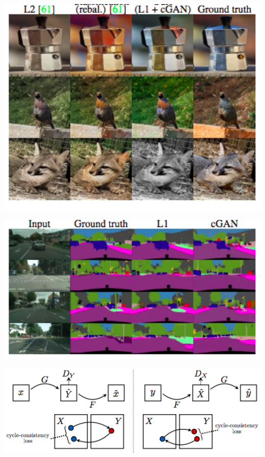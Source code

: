 {\centerline{\includegraphics[width = 6.0in]{../images/cGAN3}}


\centerline{\includegraphics[width = 8.0in]{../images/cGAN4}}


\centerline{\includegraphics[width = 8.0in]{../images/Cycle2}}


}
